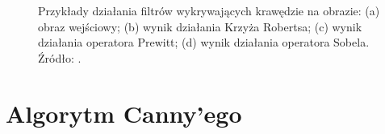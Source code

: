 \documentclass[a4paper,twocolumn,12pt]{article}
\begin{document}
\begin{figure}
 \begin{center}
 \end{center}
 \caption{
  Przykłady działania filtrów wykrywających krawędzie na obrazie:
  (a) obraz wejściowy;
  (b) wynik działania Krzyża Robertsa;
  (c) wynik działania operatora Prewitt;
  (d) wynik działania operatora Sobela.
  Źródło: \cite{maini}.
 }
 \label{fig:edges_comparison}
\end{figure}



\section{Algorytm Canny'ego}
\end{document}
